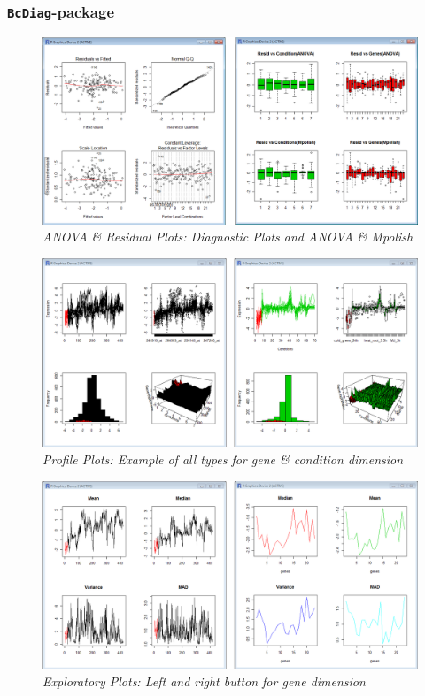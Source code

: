 \documentclass[a4paper]{article}\usepackage[]{graphicx}\usepackage[]{color}
\begin{document}
\subsubsection{\texttt{BcDiag}-package}
\begin{figure}[H]
\centering
\includegraphics[scale=0.25]{figures/bcdiag_example1.png}
\caption{{\it ANOVA \& Residual Plots: Diagnostic Plots and ANOVA \& Mpolish
}\label{bcdiag_example1}}
\end{figure}
\begin{figure}[H]
\centering
\includegraphics[scale=0.25]{figures/bcdiag_example2.png}
\caption{{\it Profile Plots: Example of all types for gene \& condition
dimension }\label{bcdiag_example2}}
\end{figure}
\begin{figure}[H]
\centering
\includegraphics[scale=0.25]{figures/bcdiag_example3.png}
\caption{{\it Exploratory Plots: Left and right button
for gene dimension}\label{bcdiag_example3}}
\end{figure}
\end{document}
